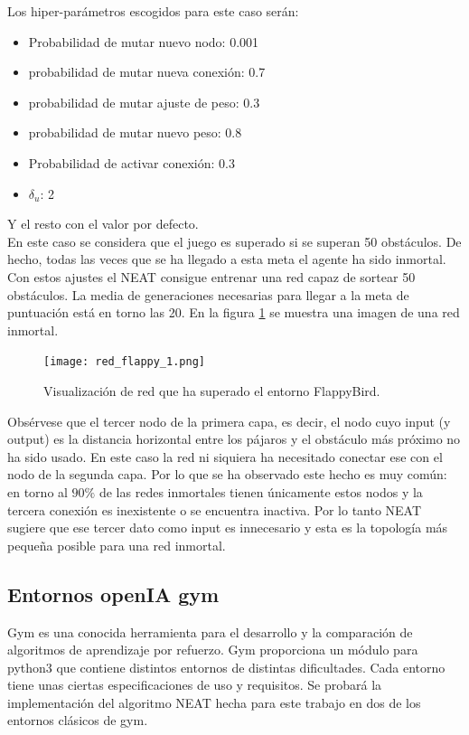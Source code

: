 \documentclass{article}
\begin{document}
Los hiper-parámetros escogidos para este caso serán:
\begin{itemize}
\item Probabilidad de mutar nuevo nodo: 0.001
\item probabilidad de mutar nueva conexión: 0.7
\item probabilidad de mutar ajuste de peso: 0.3
\item probabilidad de mutar nuevo peso: 0.8
\item Probabilidad de activar conexión: 0.3
\item $\delta_u$: 2
\end{itemize}
Y el resto con el valor por defecto.\\

En este caso se considera que el juego es superado si se superan 50 obstáculos. De hecho, todas las veces que se ha llegado a esta meta el agente ha sido inmortal.\\

Con estos ajustes el NEAT consigue entrenar una red capaz de sortear 50 obstáculos. La media de generaciones necesarias para llegar a la meta de puntuación está en torno las 20. En la figura \ref{fig:red_fb} se muestra una imagen de una red inmortal.
\begin{figure}[htbp]
\centering
\texttt{[image: red\_flappy\_1.png]}
\caption{Visualización de red que ha superado el entorno FlappyBird.}
\label{fig:red_fb}
\end{figure}




Obsérvese que el tercer nodo de la primera capa, es decir, el nodo cuyo input (y output) es la distancia horizontal entre los pájaros y el obstáculo más próximo no ha sido usado. En este caso la red ni siquiera ha necesitado conectar ese con el nodo de la segunda capa. Por lo que se ha observado este hecho es muy común: en torno al $90\%$ de las redes inmortales tienen únicamente estos nodos y la tercera conexión es inexistente o se encuentra inactiva. Por lo tanto NEAT sugiere que ese tercer dato como input es innecesario y esta es la topología más pequeña posible para una red inmortal.


\subsection{Entornos openIA gym}
Gym es una conocida herramienta para el desarrollo y la comparación de algoritmos de aprendizaje por refuerzo. Gym proporciona un módulo para python3 que contiene distintos entornos de distintas dificultades. Cada entorno tiene unas ciertas especificaciones de uso y requisitos. Se probará la implementación del algoritmo NEAT hecha para este trabajo en dos de los entornos clásicos de gym.
\end{document}
